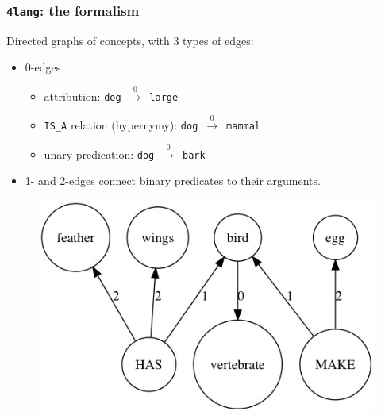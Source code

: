 \documentclass[bigger]{beamer}
\newcommand{\fl}{\texttt{4lang}\xspace}
\begin{document}
{

\begin{frame}
    \frametitle{\fl: the formalism \citep{Kornai:2010,Kornai:2015a}}
\pause Directed graphs of concepts, with 3 types of edges:
\begin{itemize}
    \pause \item 0-edges
        \begin{itemize}
            \pause \item attribution: \texttt{dog}~$\xrightarrow0$~\texttt{large}
            \pause \item \texttt{IS\_A} relation (hypernymy): \texttt{dog}~$\xrightarrow0$~\texttt{mammal}
            \pause \item unary predication: \texttt{dog}~$\xrightarrow0$~\texttt{bark}
        \end{itemize}
    \pause \item 1- and 2-edges connect binary predicates to their arguments.
\end{itemize}
\pause \begin{figure}
\centering
    \includegraphics[scale=0.4]{pics/bird.jpg}
\end{figure}
\end{frame}
}
\end{document}
